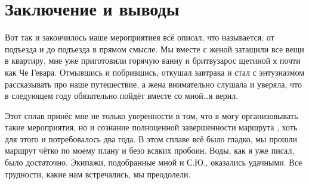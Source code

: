 \chapter{Заключение и выводы} 

Вот так и закончилось наше мероприятие\mdash я всё описал, что называется, от подъезда и до подъезда в прямом смысле. Мы вместе с женой затащили все вещи в квартиру, мне уже приготовили горячую ванну и бритву\mdash зарос щетиной я почти как Че Гевара. Отмывшись и побрившись, откушал завтрака и стал с энтузиазмом рассказывать про наше путешествие, а жена внимательно слушала и уверяла, что в следующем году обязательно пойдёт вместе со мной\ldots я верил.

Этот сплав принёс мне не только уверенности в том, что я могу организовывать такие мероприятия, но и сознание полноценной завершенности маршрута , хоть для этого и потребовалось два года. В этом сплаве всё было гладко, мы прошли маршрут чётко по моему плану и безо всяких пробоин. Воды, как я уже писал, было достаточно. Экипажи, подобранные мной и С.Ю., оказались удачными. Все трудности, какие нам встречались, мы преодолели.

